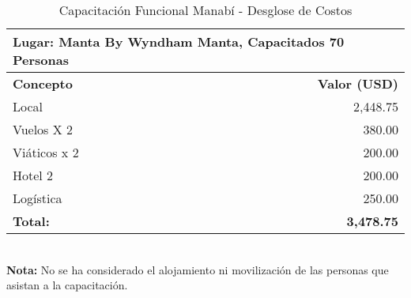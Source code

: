 \begin{itemize}
\begin{itemize}
        \begin{table}[h]
            \centering
            \begin{tabular}{|l|r|}
                \hline
                \multicolumn{2}{|l|}{Lugar: Manta By Wyndham Manta, Capacitados 70 Personas} \\
                \hline
                \textbf{Concepto} & \textbf{Valor (USD)} \\
                \hline
                Local & 2,448.75 \\
                \hline
                Vuelos X 2 & 380.00 \\
                \hline
                Viáticos x 2 & 200.00 \\
                \hline
                Hotel 2 & 200.00 \\
                \hline
                Logística & 250.00 \\
                \hline
                \textbf{Total:} & \textbf{3,478.75} \\
                \hline
            \end{tabular}
            \caption{Capacitación Funcional Manabí - Desglose de Costos}
            \label{tab:capacitacion-manabi-funcional}
        \end{table}\\
        \textbf{Nota:} No se ha considerado el alojamiento ni movilización de las personas que asistan a la capacitación.
    \end{itemize}
\end{itemize}